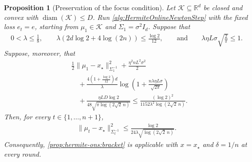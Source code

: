 \documentclass{article}
\theoremstyle{plain}
\newtheorem{proposition}[theorem]{Proposition}
\theoremstyle{definition}
\theoremstyle{plain}
\newcommand{\R}{\mathbb R}
\newcommand{\cK}{\mathcal K}
\begin{document}
\begin{proposition}[Preservation of the focus condition]
    \label{prop:hermite-ons:focus}
    Let $\cK\subseteq\R^d$ be closed and convex with
    $\operatorname{diam}(\cK)\leq D$.
    Run
    \cref{alg:HermiteOnlineNewtonStep} with the fixed loss $e_t=e$,
    starting from $\mu_1\in\cK$ and $\Sigma_1=\sigma^2I_d$.
    Suppose that
    \begin{align}
        0<\lambda\leq\frac18,
        \qquad
        \lambda
        \left(
        2d\log2+4\log(2n)
        \right)
        \leq
        \frac{\log2}{12},
        \qquad
        \text{and}\qquad
        \lambda\eta L\sigma\sqrt{\frac{2}{\pi}}
        \leq1.
        \label{eq:hermite-ons:focus-dimension}
    \end{align}
    Suppose, moreover, that
    \begin{align}
         & \frac12
        \|\mu_1-x_\star\|_{\Sigma_1^{-1}}^2
        +
        \frac{\eta^2nL^2\sigma^2}{2}
        \nonumber  \\
         & \quad+
        \frac{
            4\left(1+\frac{\log2}{12}\right)d
        }{\lambda}
        \log\left(
        1+\frac{n\lambda\eta L\sigma}{\sqrt{2\pi}}
        \right)
        \nonumber  \\
         & \quad+
        \frac{\eta LD\log2}
        {48\sqrt{\pi\log(2\sqrt2\,n)}}
        \leq
        \frac{(\log2)^2}
        {1152\lambda^2\log(2\sqrt2\,n)}.
        \label{eq:hermite-ons:focus-sufficient}
    \end{align}
    Then, for every $t\in\{1,\ldots,n+1\}$,
    \begin{align}
        \|\mu_t-x_\star\|_{\Sigma_t^{-1}}^2
        \leq
        \frac{\log2}
        {24\lambda\sqrt{\log(2\sqrt2\,n)}}.
        \label{eq:hermite-ons:focus-preserved}
    \end{align}
    Consequently, \cref{prop:hermite-ons:bracket} is applicable with
    $x=x_\star$ and $\delta=1/n$ at every round.
\end{proposition}
\end{document}

